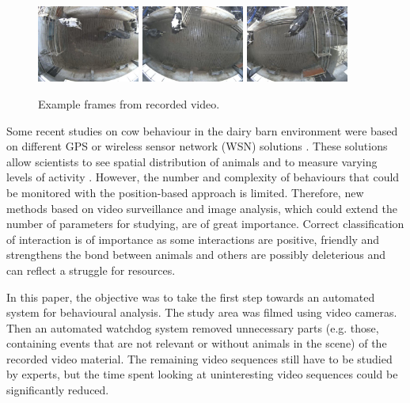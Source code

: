 \documentclass{cta-author}
\begin{document}
\begin{figure}[b]
\begin{center}
  \includegraphics[width=0.3\textwidth]{old-2.jpg}
  \includegraphics[width=0.3\textwidth]{old-1.jpg}
  \includegraphics[width=0.3\textwidth]{old-0.jpg}
\end{center}
  \caption{Example frames from recorded video.}
  \label{fig:old}
\end{figure}


Some recent studies on cow behaviour in the dairy barn environment were based on different GPS or wireless
sensor network (WSN) solutions \cite{Nadimietal2012}. These solutions allow scientists to see spatial
distribution of animals and to measure varying levels of activity \cite{Nadimietal2012}. However, the number
and complexity of behaviours that could be monitored with the position-based approach is limited. Therefore,
new methods based on video surveillance and image analysis, which could extend the number of parameters for
studying, are of great importance. Correct classification of interaction is of importance as some
interactions are positive, friendly and strengthens the bond between animals and others are possibly
deleterious and can reflect a struggle for resources.

In this paper, the objective was to take the first step towards an automated system for behavioural analysis.
The study area was filmed using video cameras. Then an automated watchdog system removed unnecessary parts
(e.g. those, containing events that are not relevant or without animals in the scene) of the recorded video
material. The remaining video sequences still have to be studied by experts, but the time spent
looking at uninteresting video sequences could be significantly reduced.
\end{document}
